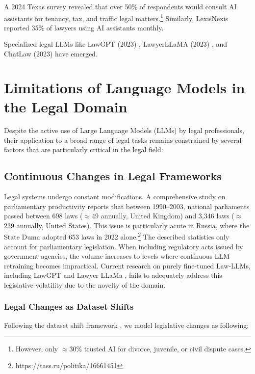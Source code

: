 A 2024 Texas survey \cite{seabrookeSurveyLayPeoples2024} revealed that over 50\% of respondents would consult AI assistants for tenancy, tax, and traffic legal matters.\footnote{
    However, only $\approx$30\% trusted AI for divorce, juvenile, or civil dispute cases.
} Similarly, LexisNexis \cite{LawyersGearGenerative} reported 35\% of lawyers using AI assistants monthly.

Specialized legal LLMs like LawGPT (2023) \cite{nguyenBriefReportLawGPT2023}, LawyerLLaMA (2023) \cite{huangLawyerLLaMATechnical2023}, and ChatLaw (2023) \cite{cuiChatlawMultiAgentCollaborative2024a} have emerged. 


\section{Limitations of Language Models in the Legal Domain}

Despite the active use of Large Language Models (LLMs) by legal professionals, 
their application to a broad range of legal tasks remains constrained by several 
factors that are particularly critical in the legal field:

\subsection{Continuous Changes in Legal Frameworks}

Legal systems undergo constant modifications. 
A comprehensive study on parliamentary productivity \cite{brouard2008legislative} 
reports that between 1990--2003, national parliaments passed between 698 laws 
($\approx$49 annually, United Kingdom) and 3,346 laws 
($\approx$239 annually, United States). 
This issue is particularly acute in Russia, where the State Duma adopted 653 laws in 2022 alone.\footnote{https://tass.ru/politika/16661451}
The described statistics only account for parliamentary legislation.
 When including regulatory acts issued by government agencies, 
 the volume increases to levels where continuous LLM retraining becomes impractical. 
 Current research on purely fine-tuned Law-LLMs, including LawGPT \cite{nguyenBriefReportLawGPT2023} and Lawyer LLaMa \cite{huangLawyerLLaMATechnical2023}, 
 fails to adequately address this legislative volatility due to the novelty of the domain.

\subsubsection{Legal Changes as Dataset Shifts}
Following the dataset shift framework \cite{kullPatternsDatasetShift}, we model legislative changes as following:

